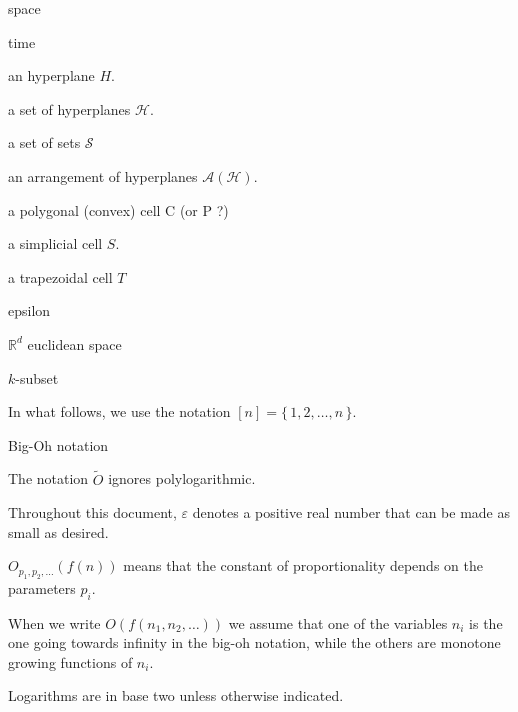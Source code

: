 
space

time

an hyperplane \(H\).

a set of hyperplanes \(\mathcal{H}\).

a set of sets \(\mathcal{S}\)

an arrangement of hyperplanes \(\mathcal{A}(\mathcal{H})\).

a polygonal (convex) cell C (or P ?)

a simplicial cell \(S\).

a trapezoidal cell \(T\)

epsilon

\(\mathbb{R}^d\) euclidean space

\(k\)-subset

In what follows, we use the notation \([n] = \{\,1,2,\ldots ,n\,\}\).

Big-Oh notation

The notation $\tilde{O}$ ignores polylogarithmic.

Throughout this document, $\varepsilon$ denotes a positive real
number that can be made as small as desired.

\(O_{p_1,p_2, \ldots}(f(n))\) means that the constant of proportionality
depends on the parameters \(p_i\).

When we write \(O(f(n_1,n_2, \ldots))\) we assume that one of the variables
\(n_i\) is
the one going towards infinity in the big-oh notation, while the others are
monotone growing functions of \(n_i\).

Logarithms are in base two unless otherwise indicated.
